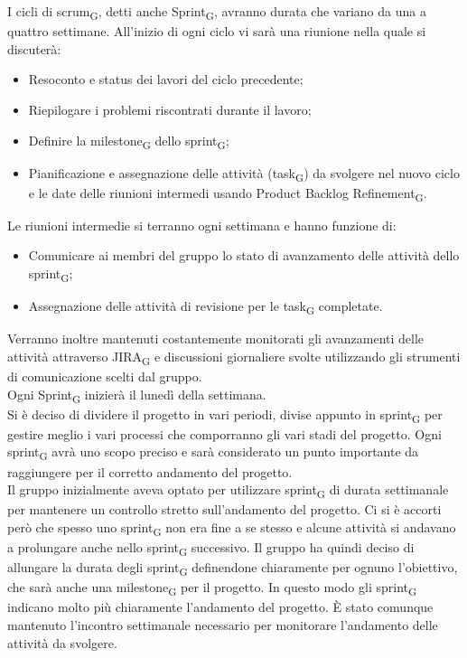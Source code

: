 I cicli di scrum\textsubscript{G}, detti anche Sprint\textsubscript{G}, avranno durata che variano da una a quattro settimane. All'inizio di ogni ciclo vi sarà una riunione nella quale si discuterà:
\begin{itemize}
	\item Resoconto e status dei lavori del ciclo precedente;
	\item Riepilogare i problemi riscontrati durante il lavoro;
	\item Definire la milestone\textsubscript{G} dello sprint\textsubscript{G};
	\item Pianificazione e assegnazione delle attività (task\textsubscript{G}) da svolgere nel nuovo ciclo e le date delle riunioni intermedi usando Product Backlog Refinement\textsubscript{G}.
\end{itemize}
Le riunioni intermedie si terranno ogni settimana e hanno funzione di:
\begin{itemize}
	\item Comunicare ai membri del gruppo lo stato di avanzamento delle attività dello sprint\textsubscript{G};
	\item Assegnazione delle attività di revisione per le task\textsubscript{G} completate.
\end{itemize}
Verranno inoltre mantenuti costantemente monitorati gli avanzamenti delle attività attraverso JIRA\textsubscript{G} e discussioni giornaliere svolte utilizzando gli strumenti di comunicazione scelti dal gruppo.\\
Ogni Sprint\textsubscript{G} inizierà il lunedì della settimana.\\
Si è deciso di dividere il progetto in vari periodi, divise appunto in sprint\textsubscript{G} per gestire meglio i vari processi che comporranno gli vari stadi del progetto. Ogni sprint\textsubscript{G} avrà uno scopo preciso e sarà considerato un punto importante da raggiungere per il corretto andamento del progetto.\\
Il gruppo inizialmente aveva optato per utilizzare sprint\textsubscript{G} di durata settimanale per mantenere un controllo stretto sull'andamento del progetto. Ci si è accorti però che spesso uno sprint\textsubscript{G} non era fine a se stesso e alcune attività si andavano a prolungare anche nello sprint\textsubscript{G} successivo. Il gruppo ha quindi deciso di allungare la durata degli sprint\textsubscript{G}  definendone chiaramente per ognuno l'obiettivo, che sarà anche una milestone\textsubscript{G} per il progetto. In questo modo gli sprint\textsubscript{G} indicano molto più chiaramente l'andamento del progetto. È stato comunque mantenuto l'incontro settimanale necessario per monitorare l'andamento delle attività da svolgere.
